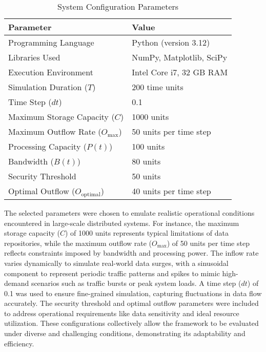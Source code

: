 \begin{table}[h]
    \centering
    \caption{System Configuration Parameters}
    \label{tab:configurations}
        \fontsize{8pt}{10pt}\selectfont
    \begin{tabular}{|l|l|}
        \hline
        \textbf{Parameter}                     & \textbf{Value}             \\ \hline
        Programming Language                  & Python (version 3.12)       \\ \hline
        Libraries Used                        & NumPy, Matplotlib, SciPy   \\ \hline
        Execution Environment                 & Intel Core i7, 32 GB RAM   \\ \hline
        Simulation Duration (\(T\))           & 200 time units             \\ \hline
        Time Step (\(dt\))                    & 0.1                        \\ \hline
        Maximum Storage Capacity (\(C\))      & 1000 units                 \\ \hline
        Maximum Outflow Rate (\(O_{\text{max}}\)) & 50 units per time step     \\ \hline
        Processing Capacity (\(P(t)\))        & 100 units                  \\ \hline
        Bandwidth (\(B(t)\))                  & 80 units                   \\ \hline
        Security Threshold                    & 50 units                   \\ \hline
        Optimal Outflow (\(O_{\text{optimal}}\)) & 40 units per time step     \\ \hline
    \end{tabular}
\end{table}

The selected parameters were chosen to emulate realistic operational conditions encountered in large-scale distributed systems. For instance, the maximum storage capacity (\(C\)) of 1000 units represents typical limitations of data repositories, while the maximum outflow rate (\(O_{\text{max}}\)) of 50 units per time step reflects constraints imposed by bandwidth and processing power. The inflow rate varies dynamically to simulate real-world data surges, with a sinusoidal component to represent periodic traffic patterns and spikes to mimic high-demand scenarios such as traffic bursts or peak system loads. A time step (\(dt\)) of 0.1 was used to ensure fine-grained simulation, capturing fluctuations in data flow accurately. The security threshold and optimal outflow parameters were included to address operational requirements like data sensitivity and ideal resource utilization. These configurations collectively allow the framework to be evaluated under diverse and challenging conditions, demonstrating its adaptability and efficiency.

